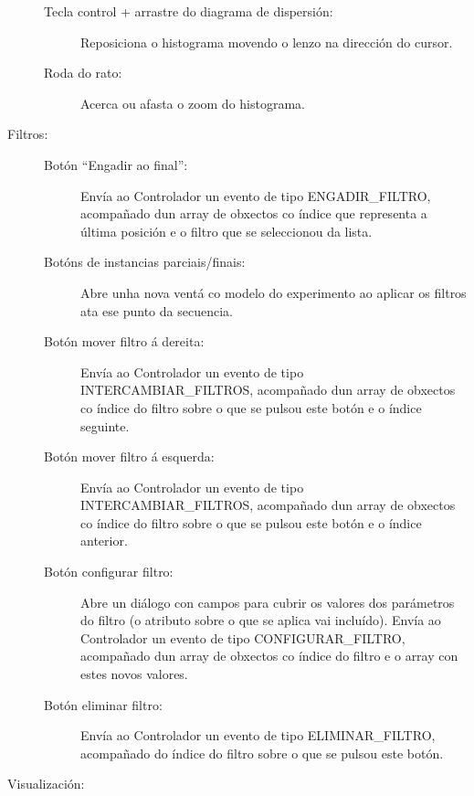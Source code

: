 \begin{description}
\begin{description}
\item[Tecla control + arrastre do diagrama de dispersión:] \hfill
Reposiciona o histograma movendo o lenzo na dirección do cursor.

\item[Roda do rato:] \hfill
Acerca ou afasta o zoom do histograma.

\end{description}

\item[Filtros:] \hfill

\begin{description}

\item[Botón ``Engadir ao final'':] \hfill
Envía ao Controlador un evento de tipo ENGADIR\_FILTRO, acompañado dun array de obxectos co índice que representa a última posición e o filtro que se seleccionou da lista.

\item[Botóns de instancias parciais/finais:] \hfill
Abre unha nova ventá co modelo do experimento ao aplicar os filtros ata ese punto da secuencia.

\item[Botón mover filtro á dereita:] \hfill
Envía ao Controlador un evento de tipo INTERCAMBIAR\_FILTROS, acompañado dun array de obxectos co índice do filtro sobre o que se pulsou este botón e o índice seguinte.

\item[Botón mover filtro á esquerda:] \hfill
Envía ao Controlador un evento de tipo INTERCAMBIAR\_FILTROS, acompañado dun array de obxectos co índice do filtro sobre o que se pulsou este botón e o índice anterior.

\item[Botón configurar filtro:] \hfill
Abre un diálogo con campos para cubrir os valores dos parámetros do filtro (o atributo sobre o que se aplica vai incluído). Envía ao Controlador un evento de tipo CONFIGURAR\_FILTRO, acompañado dun array de obxectos co índice do filtro e o array con estes novos valores.

\item[Botón eliminar filtro:] \hfill
Envía ao Controlador un evento de tipo ELIMINAR\_FILTRO, acompañado do índice do filtro sobre o que se pulsou este botón.

\end{description}

\item[Visualización:] \hfill


\end{description}
